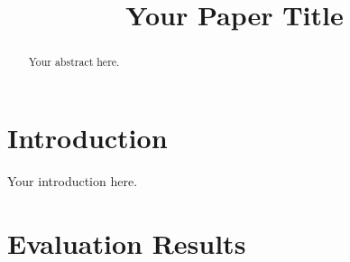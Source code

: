 \documentclass[conference]{IEEEtran}
\begin{document}
\title{Your Paper Title}

\author{
}

\maketitle

\begin{abstract}
Your abstract here.
\end{abstract}

\section{Introduction}
Your introduction here.

\section{Evaluation Results}
\end{document}
